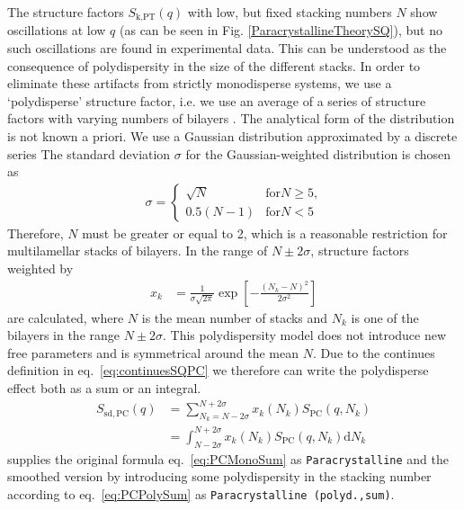 The structure factors $S_\text{k,PT}(q)$ with low, but fixed
stacking numbers $N$ show oscillations at low $q$ (as can be seen in
Fig. \ref{ParacrystallineTheorySQ}), but no such oscillations are
found in experimental data. This can be understood as the
consequence of polydispersity in the size of the different stacks.
In order to eliminate these artifacts from strictly monodisperse
systems, we use a `polydisperse' structure factor, i.e. we use an
average of a series of structure factors with varying numbers of
bilayers \cite{Fruhwirth2004}. The analytical form of the
distribution is not known a priori. We use a Gaussian distribution
approximated by a discrete series The standard deviation $\sigma$
for the Gaussian-weighted distribution is chosen as
\begin{align}
\sigma =
\begin{cases}
\sqrt{N} & \text{for} N\geq 5 \text{,} \\
0.5(N-1) & \text{for} N< 5
\end{cases}
\end{align}
Therefore, $N$ must be greater or equal to 2, which is a
reasonable restriction for multilamellar stacks of bilayers. In
the range of $N \pm 2\sigma$, structure factors weighted by
\begin{align}
x_k & = \frac{1}{\sigma\sqrt{2\pi}} \exp\left[
-\frac{(N_k-N)^2}{2\sigma^2}\right]
\end{align}
are calculated, where $N$ is the mean number of stacks and $N_k$
is one of the  bilayers in the range $N\pm 2\sigma$. This
polydispersity model does not introduce new free parameters and is
symmetrical around the mean $N$.
 Due to the continues definition in eq.\ \ref{eq:continuesSQPC} we therefore can write the polydisperse effect both as a sum or an integral.
\begin{align}
  S_\mathrm{sd,PC}(q) & = \sum_{N_k=N-2\sigma}^{N+2\sigma} x_k(N_k) S_\mathrm{PC}(q,N_k) \label{eq:PCPolySum} \\
                      & = \int_{N-2\sigma}^{N+2\sigma} x_k(N_k) S_\mathrm{PC}(q,N_k) \mathrm{d}N_k
\end{align}
\SASfit supplies the original formula eq.\ \ref{eq:PCMonoSum} as  \texttt{Paracrystalline} and the smoothed version by introducing some polydispersity in the stacking number according to eq.\ \ref{eq:PCPolySum} as \texttt{Paracrystalline (polyd.,sum)}.


